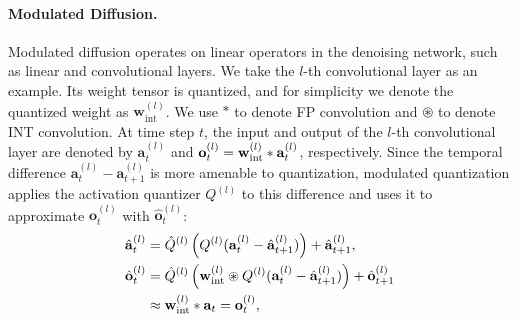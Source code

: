 \paragraph{Modulated Diffusion.} Modulated diffusion operates on linear operators in the denoising network, such as linear and convolutional layers. We take the $l$-th convolutional layer as an example. Its weight tensor is quantized, and for simplicity we denote the quantized weight as $\mathbf{w}^{(l)}_{\mathrm{int}}$. We use $*$ to denote FP convolution and $\circledast$ to denote INT convolution. At time step $t$, the input and output of the $l$-th convolutional layer are denoted by $\mathbf{a}_{t}^{(l)}$ and $\mathbf{o}_{t}^{(l)} = {\mathbf{w}}_{\mathrm{int}}^{(l)}*\mathbf{a}_{t}^{(l)}$, respectively. Since the temporal difference $\mathbf{a}_{t}^{(l)} - \mathbf{a}_{t+1}^{(l)}$ is more amenable to quantization, modulated quantization applies the activation quantizer $Q^{(l)}$ to this difference and uses it to approximate $\mathbf{o}_{t}^{(l)}$ with $\hat{\mathbf{o}}_{t}^{(l)}$:
\begin{align}
    \label{eqn:update_ahat}\hat{{\mathbf{a}}}_{t}^{(l)} & = \hat Q^{(l)}\left(Q^{{(l)}}({\mathbf{a}}_{t}^{(l)}-\hat{{\mathbf{a}}}_{t+1}^{(l)})\right) + \hat{{\mathbf{a}}}_{t+1}^{(l)},           \\
    \label{eqn:update_ohat}\hat{{\mathbf{o}}}_{t}^{(l)} & = \hat Q^{(l)}\left({\mathbf{w}}_\text{int}^{(l)}\circledast Q^{{(l)}}({\mathbf{a}}_{t}^{(l)}-\hat{{\mathbf{a}}}_{t+1}^{(l)})\right) + \hat{{\mathbf{o}}}_{t+1}^{(l)} \\
    \label{eqn:otat}                         & 
    \approx {\mathbf{w}}_{\mathrm{int}}^{(l)}*{\mathbf{a}}_t
    ={\mathbf{o}}_{t}^{{(l)}},
\end{align}

